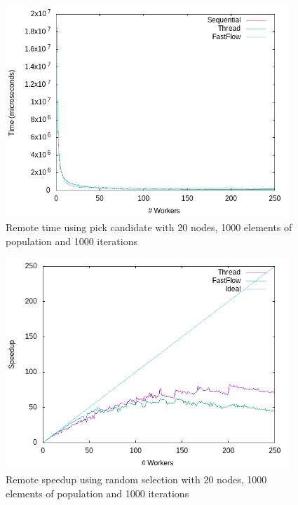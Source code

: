 \documentclass{article}
\begin{document}
    \begin{figure}
        \includegraphics[width=\linewidth,height=8cm]{img/remote_t_pick.png}
        \caption{Remote time using pick candidate with 20 nodes, 1000 elements of population and 1000 iterations}
        \label{fig:local_time}
    \end{figure}

    \begin{figure}
        \includegraphics[width=\linewidth,height=8cm]{img/remote_s_rand.png}
        \caption{Remote speedup using random selection with 20 nodes, 1000 elements of population and 1000 iterations}
        \label{fig:local_speedup}
    \end{figure}
\end{document}
